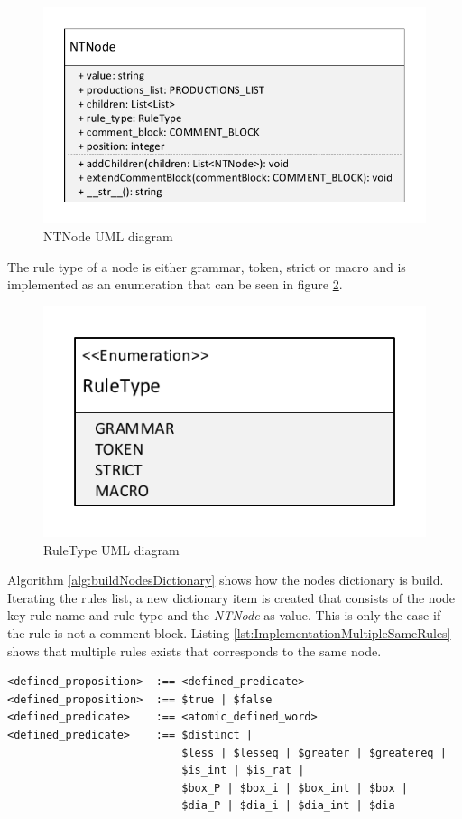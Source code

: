 \begin{figure}[H]
\centering
\includegraphics[width=1\textwidth]{images/uml_data_types_NTNode.pdf}
\caption{NTNode UML diagram}
\label{fig:ImplementationNTNodeUML}
\end{figure}

The rule type of a node is either grammar, token, strict or macro and is implemented as an enumeration that can be seen in figure \ref{fig:ImplementationRuleTypeUML}. 

\begin{figure}[H]
\centering
\includegraphics[width=.7\textwidth]{images/uml_data_types_rule_type.pdf}
\caption{RuleType UML diagram}
\label{fig:ImplementationRuleTypeUML}
\end{figure}

Algorithm \ref{alg:buildNodesDictionary} shows how the nodes dictionary is build. Iterating the rules list, a new dictionary item is created that consists of the node key rule name and rule type and the \textit{NTNode} as value. This is only the case if the rule is not a comment block. 
Listing \ref{lst:ImplementationMultipleSameRules} shows that multiple rules exists that corresponds to the same node.

\begin{lstlisting}[language=None, basicstyle=\scriptsize	,caption= Multiple rules with the same left-hand side of the rule,label= lst:ImplementationMultipleSameRules]
<defined_proposition>  :== <defined_predicate>
<defined_proposition>  :== $true | $false
<defined_predicate>    :== <atomic_defined_word>
<defined_predicate>    :== $distinct |
                           $less | $lesseq | $greater | $greatereq |
                           $is_int | $is_rat |
                           $box_P | $box_i | $box_int | $box |
                           $dia_P | $dia_i | $dia_int | $dia
\end{lstlisting}


